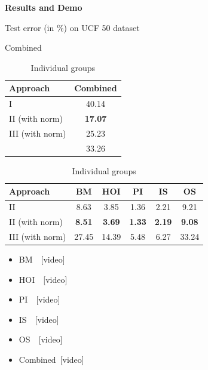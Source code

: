 \begin{frame}{\textbf{Results and Demo}}
	  \begin{scriptsize}
		\begin{table}[htbp]
		\caption{Test error (in $ \% $) on UCF 50 dataset}
			\begin{subtable}[Combined]{0.3\textwidth}
			\centering
			\caption{Combined}
			\begin{tabular}{|l|c|} \hline
				\textbf{Approach}&  \textbf{Combined} \\ \hline
        			I & 40.14\\ \hline
				II (with norm) &  {\color{yellow}\textbf{17.07}} \\ \hline		 
				III (with norm) &  25.23 \\ \hline
				\cite{recognizing50} &  33.26 \\ \hline
   			\end{tabular}
  	 	\end{subtable}
		\begin{subtable}{0.6\textwidth}
			\centering
			\caption{Individual groups}			
			\begin{tabular}{|l|c|c|c|c|c|} \hline
        			\textbf{Approach} & \textbf{BM} & \textbf{HOI} & \textbf{PI} & \textbf{IS} & \textbf{OS} \\ \hline
				II & 8.63 & 3.85 & 1.36 & 2.21 & 9.21 \\ \hline
				II (with norm) & {\color{yellow}\textbf{8.51}} & {\color{yellow}\textbf{3.69}} & {\color{yellow}\textbf{1.33}} & {\color{yellow}\textbf{2.19}} & {\color{yellow}\textbf{9.08}} \\ \hline		 
				III (with norm) & 27.45 & 14.39 & 5.48 & 6.27 & 33.24 \\ \hline
  			 \end{tabular}
	   	\end{subtable}
 		\end{table} 
	\end{scriptsize}
	\begin{center}
		\begin{small}
		\begin{multicols}{3}
		\begin{itemize}
			\item BM~~{\color{red}[video]}
			\item HOI~~{\color{red}[video]}
			\item PI~~{\color{red}[video]}
			\item IS~~{\color{red}[video]}
			\item OS~~{\color{red}[video]}
			\item Combined~{\color{red}[video]}
		\end{itemize}
		\end{multicols}
		\end{small}
	\end{center}
\end{frame}

